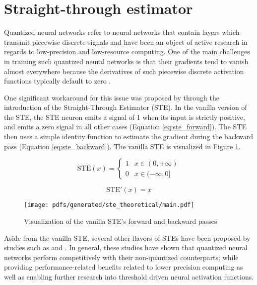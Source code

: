 \section{Straight-through estimator}

\label{section:ste}

Quantized neural networks refer to neural networks that contain
layers which transmit piecewise discrete signals and have been an object of
active research in regards to low-precision and low-resource computing. One of
the main challenges in training such quantized neural networks is
that their gradients tend to vanish almost everywhere because the derivatives of
such piecewise discrete activation functions typically default to zero
\citep{bengio2013estimating,courbariaux2016binarized,yin2019understanding}.

One significant workaround for this issue was proposed by
\citet{bengio2013estimating} through the introduction of the Straight-Through
Estimator (STE). In the vanilla version of the STE, the STE neuron emits a
signal of 1 when its input is strictly positive, and emits a zero signal in all
other cases (Equation \ref{eq:ste_forward}). The STE then uses a simple identity
function to estimate the gradient during the backward pass (Equation
\ref{eq:ste_backward}). The vanilla STE is visualized in
Figure \ref{fig:ste}.

\begin{equation}
  \label{eq:ste_forward}
  \text{STE}(x)=
  \begin{cases}
    1 & x \in (0, +\infty) \\
    0 & x \in (-\infty, 0]
  \end{cases}
\end{equation}

\begin{equation}
  \label{eq:ste_backward}
  \text{STE}'(x)= x
\end{equation}

\begin{figure}[t]
  \centering
  \texttt{[image: pdfs/generated/ste\_theoretical/main.pdf]}
  \caption{Visualization of the vanilla STE's forward and backward passes}
  \label{fig:ste}
\end{figure}

Aside from the vanilla STE, several other flavors of STEs have been proposed by
studies such as \citet{courbariaux2016binarized} and
\citet{yin2019understanding}. In general, these studies have shown that
quantized neural networks perform competitively with their
non-quantized counterparts; while providing performance-related benefits related
to lower precision computing as well as enabling further research into threshold
driven neural activation functions.


